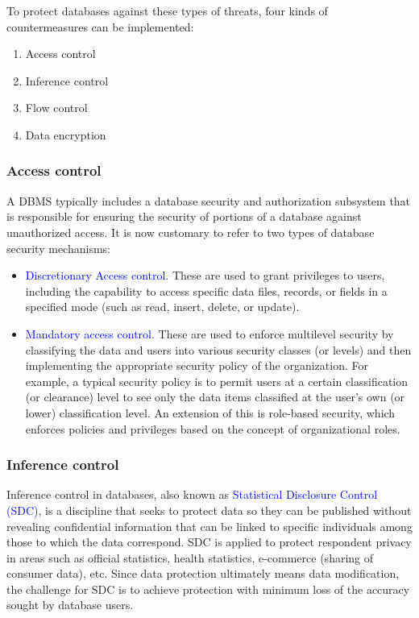 \documentclass[a4paper]{article}
\numberwithin{equation}{section}
\begin{document}
To protect databases against these types of threats, four kinds of countermeasures can be implemented:
\begin{enumerate}
  \item Access control
  \item Inference control
  \item Flow control
  \item Data encryption
\end{enumerate}

\subsubsection{Access control}
A DBMS typically includes a database security and authorization subsystem that is responsible for ensuring the security of portions of a database against unauthorized access.
It is now customary to refer to two types of database security mechanisms:
\begin{itemize}
  \item \textcolor{blue}{Discretionary Access control}.
        These are used to grant privileges to users, including the capability to access specific data files, records, or fields in a specified mode (such as read, insert, delete, or update).
  \item \textcolor{blue}{Mandatory access control}.
        These are used to enforce multilevel security by classifying the data and users into various security classes (or levels) and then implementing the appropriate security policy of the organization.
        For example, a typical security policy is to permit users at a certain classification (or clearance) level to see only the data items classified at the user’s own (or lower) classification level.
        An extension of this is role-based security, which enforces policies and privileges based on the concept of organizational roles.
\end{itemize}

\subsubsection{Inference control}
Inference control in databases, also known as \textcolor{blue}{Statistical Disclosure Control (SDC)}, is a discipline that seeks to protect data so they can be published without revealing confidential information that can be linked to specific individuals among those to which the data correspond.
SDC is applied to protect respondent privacy in areas such as official statistics, health statistics, e-commerce (sharing of consumer data), etc.
Since data protection ultimately means data modification, the challenge for SDC is to achieve protection with minimum loss of the accuracy sought by database users.
\end{document}
